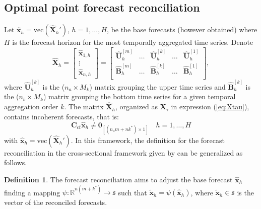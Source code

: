 \documentclass[a4paper,11pt]{article}
\newcommand{\xvet}{\bm{x}}
\newcommand{\Bvet}{\bm{B}}
\newcommand{\Cvet}{\bm{C}}
\newcommand{\Uvet}{\bm{U}}
\newcommand{\Xvet}{\bm{X}}
\newcommand{\Zerovet}{\bm{0}}
\theoremstyle{definition}
\newtheorem{definition}{Definition}[section]
\begin{document}
\subsection{Optimal point forecast reconciliation}\label{ssec:oct}

Let $\widehat{\xvet}_{h} = \mathrm{vec}\left(\widehat{\Xvet}_{h}'\right)$, $h = 1, \dots, H$, be the base forecasts (however obtained) where $H$ is the forecast horizon for the most temporally aggregated time series. Denote
$$
	\widehat{\Xvet}_{h} = \begin{bmatrix}
	\widehat{\xvet}_{1,h}\\
	\vdots\\
	\widehat{\xvet}_{n,h}
\end{bmatrix} =\begin{bmatrix}
\widehat{\Uvet}_{h}^{[m]} & \dots & \widehat{\Uvet}_{h}^{[k]} & \dots & \widehat{\Uvet}_{h}^{[1]} \\[0.25cm]
\widehat{\Bvet}_{h}^{[m]} & \dots & \widehat{\Bvet}_{h}^{[k]} & \dots & \widehat{\Bvet}_{h}^{[1]} \\ \end{bmatrix},
$$
where $\widehat{\Uvet}_{h}^{[k]}$ is the ($n_a\times M_k$) matrix grouping the upper time series and $\widehat{\Bvet}_{h}^{[k]}$ is the ($n_b\times M_k$) matrix grouping the bottom time series for a given temporal aggregation order $k$. The matrix $\widehat{\Xvet}_{h}$, organized as ${\Xvet}_{\tau}$ in expression (\ref{eq:Xtau}), contains incoherent forecasts, that is:
$$
\Cvet_{ct} \widehat{\xvet}_{h} \neq \Zerovet_{[(n_am+nk^\ast)\times1]} \quad h = 1, \dots, H
$$
with $\widehat{\xvet}_{h} = \mathrm{vec}\left(\widehat{\Xvet}_{h}'\right)$. In this framework, the definition for the forecast reconciliation in the cross-sectional framework given by \cite{panagiotelis2021} can be generalized as follows.
\begin{definition}
	The forecast reconciliation aims to adjust the base forecast $\widehat{\xvet}_{h}$ finding a mapping $\psi: \mathbb{R}^{n(m+k^\ast)} \rightarrow \mathfrak{s}$ such that $\widetilde{\xvet}_{h} = \psi\left(\widehat{\xvet}_{h}\right)$, where $\widetilde{\xvet}_{h} \in \mathfrak{s}$ is the vector of the reconciled forecasts.
\end{definition}
\end{document}
